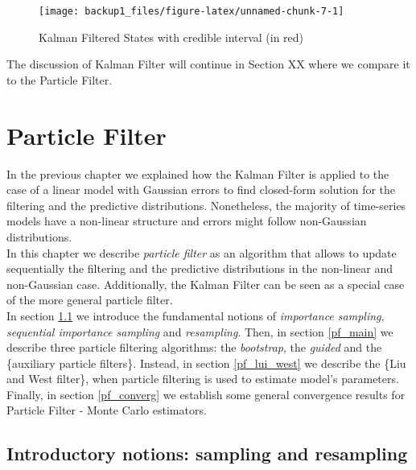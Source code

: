 \documentclass[
]{book}
\theoremstyle{break}
\theoremstyle{nonumberplain}
\begin{document}
\begin{figure}[H]

{\centering \texttt{[image: backup1\_files/figure-latex/unnamed-chunk-7-1]} 

}

\caption{Kalman Filtered States with credible interval (in red)}\label{fig:unnamed-chunk-7}
\end{figure}

The discussion of Kalman Filter will continue in Section XX where we
compare it to the Particle Filter.

\chapter{Particle Filter}

In the previous chapter we explained how the Kalman Filter is applied to
the case of a linear model with Gaussian errors to find closed-form
solution for the filtering and the predictive distributions.
Nonetheless, the majority of time-series models have a non-linear
structure and errors might follow non-Gaussian distributions.\\
In this chapter we describe \textit{particle filter} as an algorithm
that allows to update sequentially the filtering and the predictive
distributions in the non-linear and non-Gaussian case. Additionally, the
Kalman Filter can be seen as a special case of the more general particle
filter.\\
In section \ref{pf_intro} we introduce the fundamental notions of
\textit{importance sampling}, \textit{sequential importance sampling}
and \textit{resampling}. Then, in section \ref{pf_main} we describe
three particle filtering algorithms: the \textit{bootstrap}, the
\textit{guided} and the \{auxiliary particle filters\}. Instead, in
section \ref{pf_lui_west} we describe the \{Liu and West filter\}, when
particle filtering is used to estimate model's parameters. Finally, in
section \ref{pf_converg} we establish some general convergence results
for Particle Filter - Monte Carlo estimators.

\section{Introductory notions: sampling and resampling}\label{pf_intro}
\end{document}
